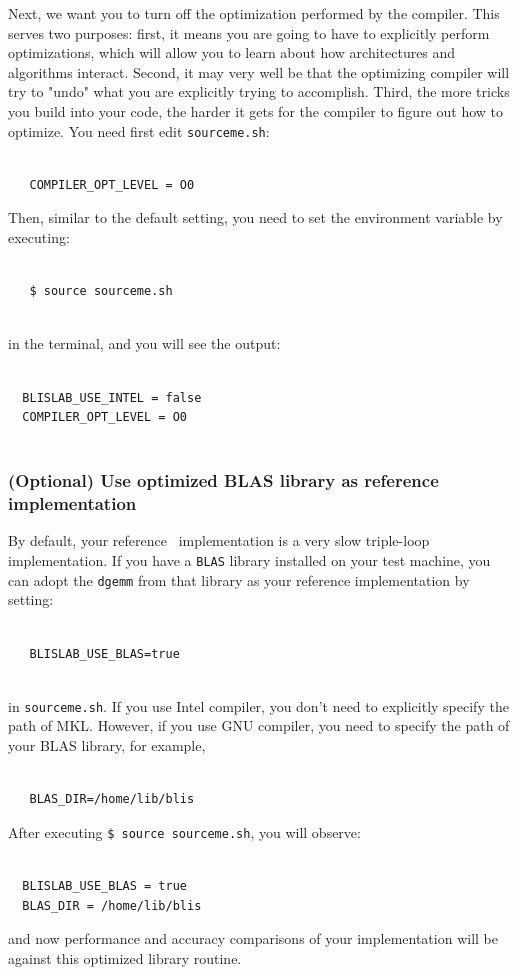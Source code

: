 Next, we want you to turn off the optimization performed by the compiler.  This serves two purposes: first, it means you are going to have to explicitly perform optimizations, which will allow you to learn about how architectures and algorithms interact.  Second, it may very well be that the optimizing compiler will try to "undo" what you are explicitly trying to accomplish.  Third, the more tricks you build into your code, the harder it gets for the compiler to figure out how to optimize.
You need first edit {\tt sourceme.sh}: 
\begin{verbatim}

   COMPILER_OPT_LEVEL = O0

\end{verbatim}
Then, similar to the default setting, you need to set the environment variable by executing:
\begin{verbatim}

   $ source sourceme.sh
   
\end{verbatim}
in the terminal, and you will see the output:
\begin{verbatim}

  BLISLAB_USE_INTEL = false
  COMPILER_OPT_LEVEL = O0
  
\end{verbatim}

\subsubsection{(\textbf{Optional}) Use optimized BLAS library as reference implementation}

By default, your reference \Gemm\ implementation is a very slow triple-loop implementation.
If you have a {\tt BLAS} library installed on your test machine, you can adopt the {\tt dgemm} from that library as your reference implementation by setting:
\begin{verbatim}

   BLISLAB_USE_BLAS=true
   
\end{verbatim}
in {\tt sourceme.sh}.
If you use Intel compiler, you don't need to explicitly specify the path of MKL. However, if you use GNU compiler, you need to specify the path of your BLAS library, for example,
\begin{verbatim}

   BLAS_DIR=/home/lib/blis

\end{verbatim}
After executing {\tt \$ source sourceme.sh}, you will observe:
\begin{verbatim}

  BLISLAB_USE_BLAS = true
  BLAS_DIR = /home/lib/blis

\end{verbatim}
and now performance and accuracy comparisons of your implementation will be against this optimized library routine.

